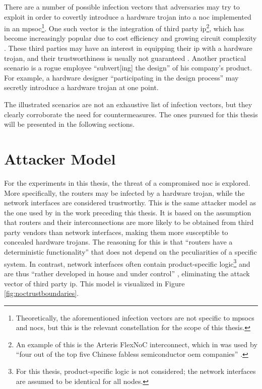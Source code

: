 There are a number of possible infection vectors that adversaries may try to exploit in order to covertly introduce a hardware trojan into a \gls{noc}
implemented in an \gls{mpsoc}\footnote{Theoretically, the aforementioned infection vectors are not specific to \glspl{mpsoc} and \glspl{noc}, but
this is the relevant constellation for the scope of this thesis.}. One such vector is the integration of third party \gls{ip}\footnote{An example of
this is the Arteris FlexNoC interconnect, which in \citeyear{ancajas14fortnocs} was used by \enquote{four out of the top five Chinese fabless
semiconductor \gls{oem} companies}
\cite[2]{ancajas14fortnocs}.}, which has become increasingly popular due to cost efficiency and growing circuit complexity
\cites[1]{ancajas14fortnocs}[2]{bhunia14hardwaretrojans}. These third parties may have an interest in equipping their \gls{ip} with a hardware trojan,
and their trustworthiness is usually not guaranteed \cite[3]{sethumadhavan15trustworthyhardware}.
Another practical scenario is a rogue employee \enquote{subvert[ing] the design} \cite[3]{sethumadhavan15trustworthyhardware} of his
company's product. For example, a hardware designer \enquote{participating in the design process} \cite[3]{sethumadhavan15trustworthyhardware} may
secretly introduce a hardware trojan at one point. 

The illustrated scenarios are not an exhaustive list of infection vectors, but they clearly corroborate the need for countermeasures. The ones pursued
for this thesis will be presented in the following sections.

\section{Attacker Model}\label{sec:attackermodelover}
For the experiments in this thesis, the threat of a compromised \gls{noc} is explored. More specifically, the routers may be infected by a hardware
trojan, while the network interfaces are considered trustworthy. This is the same attacker model as the one used by \citeauthor{moriam18activeattackers}
\cite{moriam18activeattackers} in the work preceding this thesis. It is based on the assumption that routers and their interconnections are
more likely to be obtained from third party vendors than network interfaces, making them more susceptible to concealed hardware trojans. The reasoning
for this is that \enquote{routers have a deterministic functionality} \cite[2]{moriam18activeattackers} that does not depend on the peculiarities of
a specific system. In contrast, network interfaces often contain product-specific logic\footnote{For this thesis, product-specific logic is not
considered; the network interfaces are assumed to be identical for all nodes.} and are thus \enquote{rather developed in house and under
control} \cite[2]{moriam18activeattackers}, eliminating the attack vector of third party \gls{ip}. This model is visualized in Figure
\vref{fig:noctrustboundaries}.

